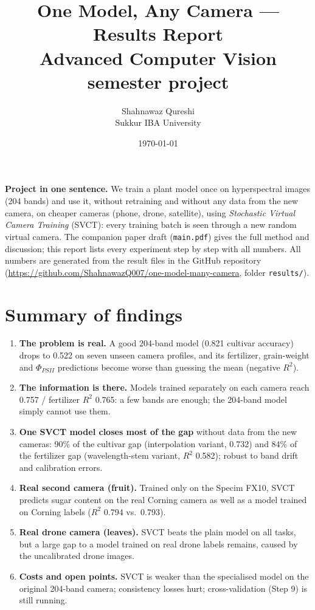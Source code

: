 \documentclass[11pt]{article}
\title{One Model, Any Camera --- Results Report\\[2pt]\large Advanced Computer Vision semester project}
\author{Shahnawaz Qureshi\\Sukkur IBA University}
\date{\today}
\begin{document}
\maketitle

\noindent\textbf{Project in one sentence.} We train a plant model once on hyperspectral images (204 bands) and use it,
without retraining and without any data from the new camera, on cheaper cameras (phone, drone, satellite), using
\emph{Stochastic Virtual Camera Training} (SVCT): every training batch is seen through a new random virtual camera.
The companion paper draft (\texttt{main.pdf}) gives the full method and discussion; this report lists every experiment
step by step with all numbers. All numbers are generated from the result files in the GitHub repository
(\url{https://github.com/ShahnawazQ007/one-model-many-camera}, folder \texttt{results/}).

\section*{Summary of findings}
\begin{enumerate}
\item \textbf{The problem is real.} A good 204-band model (0.821 cultivar accuracy) drops to 0.522 on seven unseen camera
profiles, and its fertilizer, grain-weight and $\Phi_{PSII}$ predictions become worse than guessing the mean
(negative $R^2$).
\item \textbf{The information is there.} Models trained separately on each camera reach 0.757 / fertilizer $R^2$ 0.765:
a few bands are enough; the 204-band model simply cannot use them.
\item \textbf{One SVCT model closes most of the gap} without data from the new cameras: 90\% of the cultivar gap
(interpolation variant, 0.732) and 84\% of the fertilizer gap (wavelength-stem variant, $R^2$ 0.582); robust to band
drift and calibration errors.
\item \textbf{Real second camera (fruit).} Trained only on the Specim FX10, SVCT predicts sugar content on the real Corning
camera as well as a model trained on Corning labels ($R^2$ 0.794 vs.\ 0.793).
\item \textbf{Real drone camera (leaves).} SVCT beats the plain model on all tasks, but a large gap to a model trained on
real drone labels remains, caused by the uncalibrated drone images.
\item \textbf{Costs and open points.} SVCT is weaker than the specialised model on the original 204-band camera;
consistency losses hurt; cross-validation (Step 9) is still running.
\end{enumerate}
\end{document}
